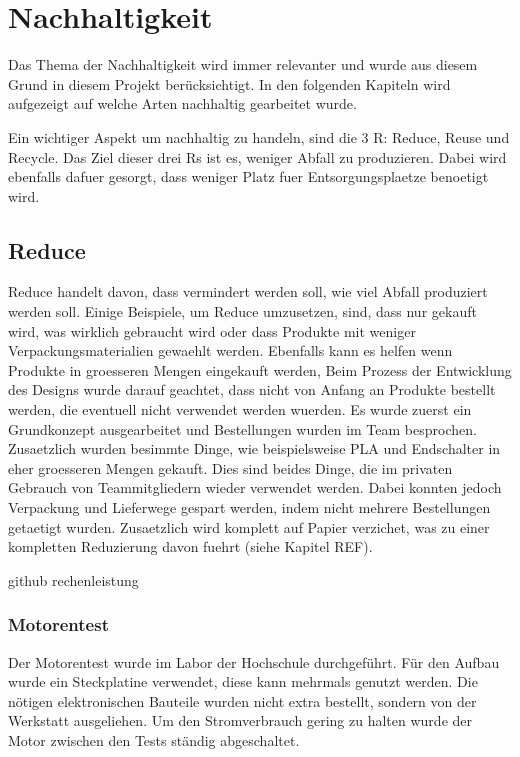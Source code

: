 \section{Nachhaltigkeit}
\label{section:Nachhaltigkeit}

Das Thema der Nachhaltigkeit wird immer relevanter und wurde aus diesem Grund in diesem Projekt berücksichtigt. In den folgenden Kapiteln wird aufgezeigt auf welche Arten nachhaltig gearbeitet wurde.

Ein wichtiger Aspekt um nachhaltig zu handeln, sind die 3 R: Reduce, Reuse und Recycle. Das Ziel dieser drei Rs ist es, weniger Abfall zu produzieren. Dabei wird ebenfalls dafuer gesorgt, dass weniger Platz fuer Entsorgungsplaetze benoetigt wird\cite{3-r}.

\subsection{Reduce}

Reduce handelt davon, dass vermindert werden soll, wie viel Abfall produziert werden soll. Einige Beispiele, um Reduce umzusetzen, sind, dass nur gekauft wird, was wirklich gebraucht wird oder dass Produkte mit weniger Verpackungsmaterialien gewaehlt werden. Ebenfalls kann es helfen wenn Produkte in groesseren Mengen eingekauft werden, Beim Prozess der Entwicklung des Designs wurde darauf geachtet, dass nicht von Anfang an Produkte bestellt werden, die eventuell nicht verwendet werden wuerden. Es wurde zuerst ein Grundkonzept ausgearbeitet und Bestellungen wurden im Team besprochen. Zusaetzlich wurden besimmte Dinge, wie beispielsweise PLA und Endschalter in eher groesseren Mengen gekauft. Dies sind beides Dinge, die im privaten Gebrauch von Teammitgliedern wieder verwendet werden. Dabei konnten jedoch Verpackung und Lieferwege gespart werden, indem nicht mehrere Bestellungen getaetigt wurden. Zusaetzlich wird komplett auf Papier verzichet, was zu einer kompletten Reduzierung davon fuehrt (siehe Kapitel REF).

 github rechenleistung

\subsubsection{Motorentest}

Der Motorentest wurde im Labor der Hochschule durchgeführt. Für den Aufbau wurde ein Steckplatine verwendet, diese kann mehrmals genutzt werden. Die nötigen elektronischen Bauteile wurden nicht extra bestellt, sondern von der Werkstatt ausgeliehen. Um den Stromverbrauch gering zu halten wurde der Motor zwischen den Tests ständig abgeschaltet. 

